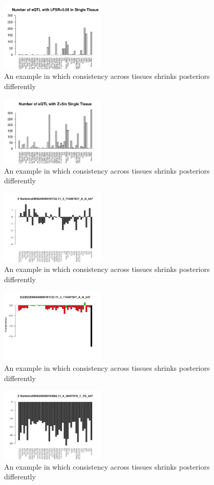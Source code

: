 \documentclass[10pt,letterpaper]{article}
\begin{document}
 \begin{figure}
\includegraphics[width=5cm]{lfsr>0.05}
\caption{An example in which consistency across tissues shrinks posteriors differently}
\end{figure}


 \begin{figure}
\includegraphics[width=5cm]{z>5}
\caption{An example in which consistency across tissues shrinks posteriors differently}
\end{figure}
 \begin{figure}
\includegraphics[width=5cm]{singletonz.png}
\caption{An example in which consistency across tissues shrinks posteriors differently}
\end{figure}

 \begin{figure}
\includegraphics[width=5cm]{singleton.png}
\caption{An example in which consistency across tissues shrinks posteriors differently}
\end{figure}

 \begin{figure}
\includegraphics[width=5cm]{consistentz.png}
\caption{An example in which consistency across tissues shrinks posteriors differently}
\end{figure}
\end{document}

